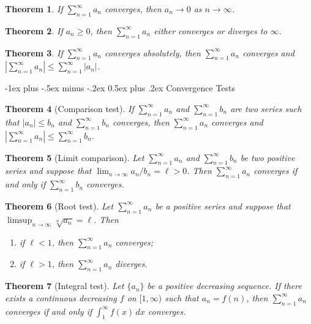\documentclass[10pt,landscape]{article}
\makeatletter
\newtheorem{theorem}{Theorem}
\renewcommand{\section}{\@startsection{section}{1}{0mm}%
                                {-1ex plus -.5ex minus -.2ex}%
                                {0.5ex plus .2ex}%
                                {\normalfont\large\bfseries}}
\makeatother
\begin{document}
\begin{multicols}{3}
\begin{theorem}
  If $\sum_{n = 1}^\infty a_n$ converges, then
  $a_n \to 0$ as $n \to \infty$.
\end{theorem}

\begin{theorem}
  If $a_n \ge 0$, then $\sum_{n = 1}^\infty a_n$
  either converges or diverges to $\infty$.
\end{theorem}

\begin{theorem}
  If $\sum_{n = 1}^\infty a_n$ converges absolutely,
  then $\sum_{n = 1}^\infty a_n$ converges and
  $\left|\sum_{n = 1}^\infty a_n\right| \le \sum_{n = 1}^\infty |a_n|$.
\end{theorem}

\section{Convergence Tests}
\begin{theorem}[Comparison test]
  If $\sum_{n = 1}^\infty a_n$ and $\sum_{n = 1}^\infty b_n$
  are two series such that $|a_n| \le b_n$ and
  $\sum_{n = 1}^\infty b_n$ converges, then
  $\sum_{n = 1}^\infty a_n$ converges and
  $\left|\sum_{n = 1}^\infty a_n\right| \le \sum_{n = 1}^\infty b_n$.
\end{theorem}

\begin{theorem}[Limit comparison]
  Let $\sum_{n = 1}^\infty a_n$ and $\sum_{n = 1}^\infty b_n$
  be two positive series and suppose that
  $\lim_{n \to \infty} a_n / b_n = \ell > 0$.
  Then $\sum_{n = 1}^\infty a_n$ converges if and only if
  $\sum_{n = 1}^\infty b_n$ converges.
\end{theorem}

\begin{theorem}[Root test]
  Let $\sum_{n = 1}^\infty a_n$ be a positive
  series and suppose that
  $\limsup_{n \to \infty} \sqrt[n]{a_n} = \ell$.
  Then
  \begin{enumerate}
    \item if $\ell < 1$, then $\sum_{n = 1}^\infty a_n$ converges;
    \item if $\ell > 1$, then $\sum_{n = 1}^\infty a_n$ diverges.
  \end{enumerate}
\end{theorem}

\begin{theorem}[Integral test]
  Let $\{a_n\}$ be a positive decreasing sequence.
  If there exists a continuous decreasing $f$ on
  $[1, \infty)$ such that $a_n = f(n)$, then
  $\sum_{n = 1}^\infty a_n$ converges if and only if
  $\int_1^\infty f(x)\, dx$ converges.
\end{theorem}


\end{multicols}
\end{document}
